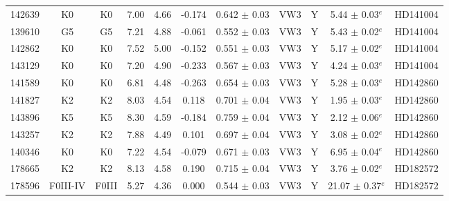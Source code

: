 \begin{tabular}{ccccccccccc}
142639 & K0 & K0 & 7.00 & 4.66 & -0.174 & 0.642 $\pm$ 0.03 & VW3 & Y & 5.44 $\pm$ 0.03$^e$ &HD141004\\
139610 & G5 & G5 & 7.21 & 4.88 & -0.061 & 0.552 $\pm$ 0.03 & VW3 & Y & 5.43 $\pm$ 0.02$^e$ &HD141004\\
142862 & K0 & K0 & 7.52 & 5.00 & -0.152 & 0.551 $\pm$ 0.03 & VW3 & Y & 5.17 $\pm$ 0.02$^e$ &HD141004\\
143129 & K0 & K0 & 7.20 & 4.90 & -0.233 & 0.567 $\pm$ 0.03 & VW3 & Y & 4.24 $\pm$ 0.03$^e$ &HD141004\\
141589 & K0 & K0 & 6.81 & 4.48 & -0.263 & 0.654 $\pm$ 0.03 & VW3 & Y & 5.28 $\pm$ 0.03$^e$ &HD142860\\
141827 & K2 & K2 & 8.03 & 4.54 & 0.118 & 0.701 $\pm$ 0.04 & VW3 & Y & 1.95 $\pm$ 0.03$^e$ &HD142860\\
143896 & K5 & K5 & 8.30 & 4.59 & -0.184 & 0.759 $\pm$ 0.04 & VW3 & Y & 2.12 $\pm$ 0.06$^e$ &HD142860\\
143257 & K2 & K2 & 7.88 & 4.49 & 0.101 & 0.697 $\pm$ 0.04 & VW3 & Y & 3.08 $\pm$ 0.02$^e$ &HD142860\\
140346 & K0 & K0 & 7.22 & 4.54 & -0.079 & 0.671 $\pm$ 0.03 & VW3 & Y & 6.95 $\pm$ 0.04$^e$ &HD142860\\
178665 & K2 & K2 & 8.13 & 4.58 & 0.190 & 0.715 $\pm$ 0.04 & VW3 & Y & 3.76 $\pm$ 0.02$^e$ &HD182572\\
178596 & F0III-IV & F0III & 5.27 & 4.36 & 0.000 & 0.544 $\pm$ 0.03 & VW3 & Y & 21.07 $\pm$ 0.37$^e$ &HD182572\\
\hline
\end{tabular}
